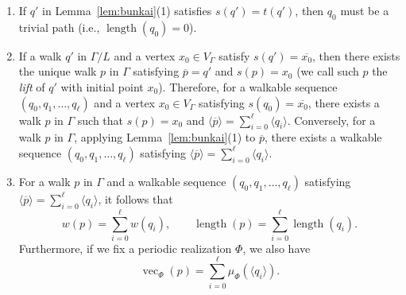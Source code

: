 \documentclass[ALCO,published]{cedram}
\theoremstyle{remark}
\begin{document}
\medskip \medskip

\begin{rmk}\label{rmk:bunkai} \hfill
\begin{enumerate}
\item
If $q'$ in Lemma~\ref{lem:bunkai}(1) satisfies $s(q') = t(q')$, then $q_0$ must be a trivial path 
(i.e., $\operatorname{length}(q_0)=0$). 

\item
If a walk $q'$ in $\Gamma /L$ and a vertex $x_0 \in V_{\Gamma}$ satisfy $s(q') = \overline{x_0}$, 
then there exists the unique walk $p$ in $\Gamma$ satisfying $\overline{p} = q'$ and $s(p) = x_0$ 
(we call such $p$ the \textit{lift} of $q'$ with initial point $x_0$). 
Therefore, for a walkable sequence $(q_0, q_1, \ldots, q_{\ell})$ and a vertex $x_0 \in V_{\Gamma}$ satisfying $s(q_0) = \overline{x_0}$, 
there exists a walk $p$ in $\Gamma$ such that 
$s(p) = x_0$ and $\langle \overline{p} \rangle = \sum _{i = 0} ^{\ell} \langle q_i \rangle$. 
Conversely, for a walk $p$ in $\Gamma$, applying Lemma~\ref{lem:bunkai}(1) to $\overline{p}$, 
there exists a walkable sequence $(q_0, q_1, \ldots, q_{\ell})$ satisfying 
$\langle \overline{p} \rangle = \sum _{i = 0} ^{\ell} \langle q_i \rangle$. 

\item
For a walk $p$ in $\Gamma$ and a walkable sequence $(q_0, q_1, \ldots, q_{\ell})$ satisfying 
$\langle \overline{p} \rangle = \sum _{i = 0} ^{\ell} \langle q_i \rangle$,  
it follows that 
\[
w(p) = 
\sum _{i=0}^{\ell} w(q_i), \qquad
\operatorname{length}(p) = 
\sum _{i=0}^{\ell} \operatorname{length}(q_i). 
\]
Furthermore, if we fix a periodic realization $\Phi$, we also have 
\[
\operatorname{vec}_{\Phi}(p) = \sum _{i=0}^{\ell} \mu_{\Phi} ( \langle q_i \rangle). 
\]
\end{enumerate}
\end{rmk}
\end{document}
